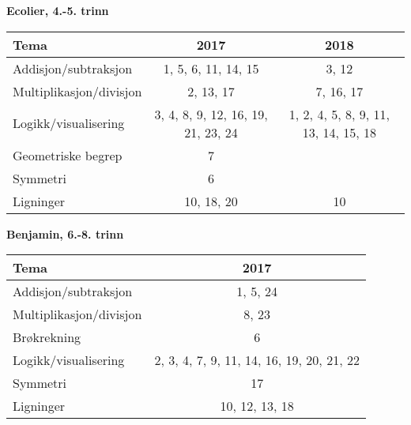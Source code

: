 



\begin{center}
	\textbf{Ecolier, 4.-5. trinn} \vsk
	\begin{tabular}{l |c | c|}
\textbf{Tema}&\textbf{2017} & \textbf{2018} \\ \hline
Addisjon/subtraksjon& 1, 5, 6, 11, 14, 15 & 3, 12 \\ \hline
Multiplikasjon/divisjon	&2, 13, 17 & 7, 16, 17\\ \hline
Logikk/visualisering & 3, 4, 8, 9, 12, 16, 19, 21, 23, 24 & 1, 2, 4, 5, 8, 9, 11, 13, 14, 15, 18 \\ \hline
Geometriske begrep& 7 \\ \hline
Symmetri & 6 \\\hline
Ligninger& 10, 18, 20 & 10\\ \hline
\end{tabular}
\end{center}
\begin{center}
	\textbf{Benjamin, 6.-8. trinn} \vsk
	\begin{tabular}{l |c|}
		\textbf{Tema}&\textbf{2017} \\ \hline
		Addisjon/subtraksjon& 1, 5, 24 \\ \hline
		Multiplikasjon/divisjon	& 8, 23 \\ \hline
		Brøkrekning & 6 \\ \hline
		Logikk/visualisering &  2, 3, 4, 7, 9, 11, 14, 16, 19, 20, 21, 22 \\ \hline
		Symmetri& 17  \\ \hline
		Ligninger& 10, 12, 13, 18\\ \hline
	\end{tabular}
\end{center}



